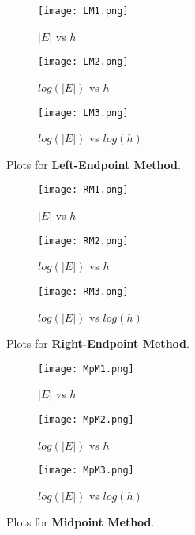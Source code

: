 \documentclass[a4paper, 12pt]{report}
\begin{document}
\begin{figure}[!h]
\centering
\begin{subfigure}{.55\textwidth}
  \centering
  \texttt{[image: LM1.png]}
  \caption{$|E|$ vs $h$}
\end{subfigure}%
\begin{subfigure}{.55\textwidth}
  \centering
  \texttt{[image: LM2.png]}
  \caption{$log(|E|)$ vs $h$}
\end{subfigure}
\begin{subfigure}{.55\textwidth}
  \centering
  \texttt{[image: LM3.png]}
  \caption{$log(|E|)$ vs $log(h)$}
\end{subfigure}
\caption{Plots for \textbf{Left-Endpoint Method}.}
\label{fig:Plot1}
\end{figure}
\begin{figure}[!h]
\centering
\begin{subfigure}{.55\textwidth}
  \centering
  \texttt{[image: RM1.png]}
  \caption{$|E|$ vs $h$}
\end{subfigure}%
\begin{subfigure}{.55\textwidth}
  \centering
  \texttt{[image: RM2.png]}
  \caption{$log(|E|)$ vs $h$}
\end{subfigure}
\begin{subfigure}{.55\textwidth}
  \centering
  \texttt{[image: RM3.png]}
  \caption{$log(|E|)$ vs $log(h)$}
\end{subfigure}
\caption{Plots for \textbf{Right-Endpoint Method}.}
\label{fig:Plot2}
\end{figure}
\begin{figure}[h]
\centering
\begin{subfigure}{.55\textwidth}
  \centering
  \texttt{[image: MpM1.png]}
  \caption{$|E|$ vs $h$}
\end{subfigure}%
\begin{subfigure}{.55\textwidth}
  \centering
  \texttt{[image: MpM2.png]}
  \caption{$log(|E|)$ vs $h$}
\end{subfigure}
\begin{subfigure}{.55\textwidth}
  \centering
  \texttt{[image: MpM3.png]}
  \caption{$log(|E|)$ vs $log(h)$}
\end{subfigure}
\caption{Plots for \textbf{Midpoint Method}.}
\label{fig:Plot3}
\end{figure}
\end{document}
